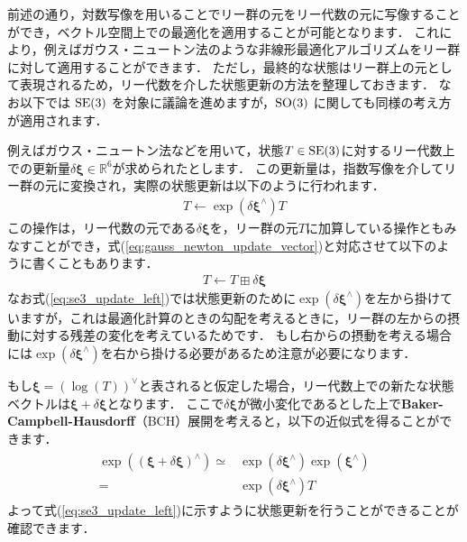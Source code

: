 前述の通り，対数写像を用いることでリー群の元をリー代数の元に写像することができ，ベクトル空間上での最適化を適用することが可能となります．
これにより，例えばガウス・ニュートン法のような非線形最適化アルゴリズムをリー群に対して適用することができます．
ただし，最終的な状態はリー群上の元として表現されるため，リー代数を介した状態更新の方法を整理しておきます．
なお以下では ${\rm SE}(3)$ を対象に議論を進めますが，${\rm SO}(3)$ に関しても同様の考え方が適用されます．

例えばガウス・ニュートン法などを用いて，状態$T \in {\rm SE}(3)$に対するリー代数上での更新量$\delta \boldsymbol \xi \in \mathbb{R}^6$が求められたとします．
この更新量は，指数写像を介してリー群の元に変換され，実際の状態更新は以下のように行われます．
%
\begin{align}
  T \leftarrow \exp \left( \delta \boldsymbol \xi^{\wedge} \right) T
  \label{eq:se3_update_left}
\end{align}
%
この操作は，リー代数の元である$\delta \boldsymbol \xi$を，リー群の元$T$に加算している操作ともみなすことができ，式(\ref{eq:gauss_newton_update_vector})と対応させて以下のように書くこともあります．
%
\begin{align}
  T \leftarrow T \boxplus \delta \boldsymbol \xi
  \label{eq:se3_update_left_boxplus}
\end{align}
%
なお式(\ref{eq:se3_update_left})では状態更新のために$\exp \left( \delta \boldsymbol \xi^{\wedge} \right)$を左から掛けていますが，これは最適化計算のときの勾配を考えるときに，リー群の左からの摂動に対する残差の変化を考えているためです．
もし右からの摂動を考える場合には$\exp \left( \delta \boldsymbol \xi^{\wedge} \right)$を右から掛ける必要があるため注意が必要になります．

もし$\boldsymbol \xi = \left( \log \left( T \right) \right)^{\vee}$と表されると仮定した場合，リー代数上での新たな状態ベクトルは$\boldsymbol \xi + \delta \boldsymbol \xi$となります．
ここで$\delta \boldsymbol \xi$が微小変化であるとした上で{\bf Baker-Campbell-Hausdorff}（BCH）展開を考えると，以下の近似式を得ることができます．
%
\begin{align}
  \begin{split}
    \exp\left( (\boldsymbol \xi + \delta \boldsymbol \xi)^{\wedge} \right)
    \simeq & 
    \exp(\delta \boldsymbol \xi^{\wedge}) \exp(\boldsymbol \xi^{\wedge}) \\
    = &
    \exp(\delta \boldsymbol \xi^{\wedge}) T
  \end{split}
\end{align}
%
よって式(\ref{eq:se3_update_left})に示すように状態更新を行うことができることが確認できます．













